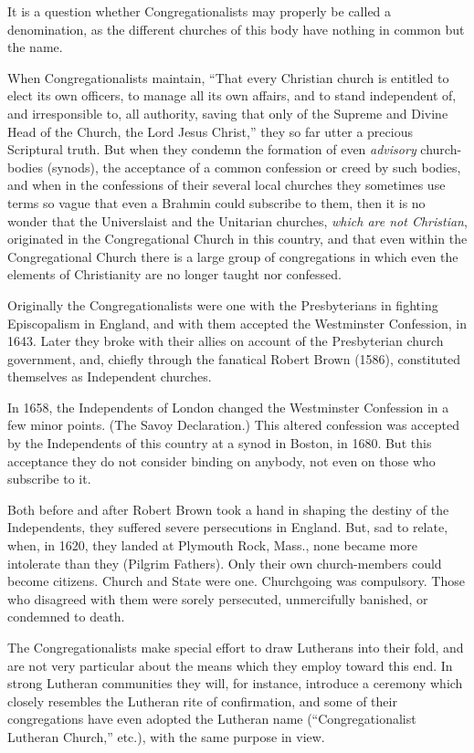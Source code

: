 \documentclass[
]{book}
\begin{document}
It is a question whether Congregationalists may properly be called a denomination, as the different churches of this body have nothing in common but the name.

When Congregationalists maintain, ``That every Christian church is entitled to elect its own officers, to manage all its own affairs, and to stand independent of, and irresponsible to, all authority, saving that only of the Supreme and Divine Head of the Church, the Lord Jesus Christ,'' they so far utter a precious Scriptural truth. But when they condemn the formation of even \emph{advisory} church-bodies (synods), the acceptance of a common confession or creed by such bodies, and when in the confessions of their several local churches they sometimes use terms so vague that even a Brahmin could subscribe to them, then it is no wonder that the Universlaist and the Unitarian churches, \emph{which are not Christian}, originated in the Congregational Church in this country, and that even within the Congregational Church there is a large group of congregations in which even the elements of Christianity are no longer taught nor confessed.

Originally the Congregationalists were one with the Presbyterians in fighting Episcopalism in England, and with them accepted the Westminster Confession, in 1643. Later they broke with their allies on account of the Presbyterian church government, and, chiefly through the fanatical Robert Brown (1586), constituted themselves as Independent churches.

In 1658, the Independents of London changed the Westminster Confession in a few minor points. (The Savoy Declaration.) This altered confession was accepted by the Independents of this country at a synod in Boston, in 1680. But this acceptance they do not consider binding on anybody, not even on those who subscribe to it.

Both before and after Robert Brown took a hand in shaping the destiny of the Independents, they suffered severe persecutions in England. But, sad to relate, when, in 1620, they landed at Plymouth Rock, Mass., none became more intolerate than they (Pilgrim Fathers). Only their own church-members could become citizens. Church and State were one. Churchgoing was compulsory. Those who disagreed with them were sorely persecuted, unmercifully banished, or condemned to death.

The Congregationalists make special effort to draw Lutherans into their fold, and are not very particular about the means which they employ toward this end. In strong Lutheran communities they will, for instance, introduce a ceremony which closely resembles the Lutheran rite of confirmation, and some of their congregations have even adopted the Lutheran name (``Congregationalist Lutheran Church,'' etc.), with the same purpose in view.
\end{document}
